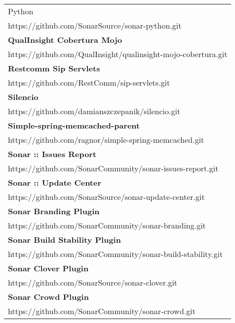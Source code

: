 \begin{table}[]
\begin{tabular}{|p{130mm}|}
Python                                             \\ https://github.com/SonarSource/sonar-python.git                              \\ \hline \bf
QualInsight Cobertura Mojo                         \\ https://github.com/QualInsight/qualinsight-mojo-cobertura.git                \\ \hline \bf
Restcomm Sip Servlets                              \\ https://github.com/RestComm/sip-servlets.git                                 \\ \hline \bf
Silencio                                           \\ https://github.com/damianszczepanik/silencio.git                             \\ \hline \bf
Simple-spring-memcached-parent                     \\ https://github.com/ragnor/simple-spring-memcached.git                        \\ \hline \bf
Sonar :: Issues Report                  \\ https://github.com/SonarCommunity/sonar-issues-report.git                    \\ \hline \bf
Sonar :: Update Center                             \\ https://github.com/SonarSource/sonar-update-center.git                       \\ \hline \bf
Sonar Branding Plugin                              \\ https://github.com/SonarCommunity/sonar-branding.git                         \\ \hline \bf 
Sonar Build Stability Plugin                       \\ https://github.com/SonarCommunity/sonar-build-stability.git                  \\ \hline \bf
Sonar Clover Plugin                                \\ https://github.com/SonarSource/sonar-clover.git                              \\ \hline \bf
Sonar Crowd Plugin                                 \\ https://github.com/SonarCommunity/sonar-crowd.git                            \\ \hline

\end{tabular}
\end{table}

